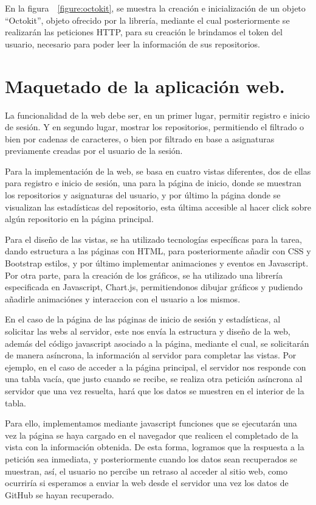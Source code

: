 En la figura~~\ref{figure:octokit}, se muestra la creación e inicialización de un objeto “Octokit”, objeto ofrecido por la librería, mediante el cual posteriormente se realizarán las peticiones HTTP, para su creación le brindamos el token del usuario, necesario para poder leer la información de sus repositorios. 



\section{Maquetado de la aplicación web.}

La funcionalidad de la web debe ser, en un primer lugar, permitir registro e inicio de sesión. Y en segundo lugar, mostrar los repositorios, permitiendo el filtrado o bien por cadenas de caracteres, o bien por filtrado en base a asignaturas previamente creadas por el usuario de la sesión.

Para la implementación de la web, se basa en cuatro vistas diferentes, dos de ellas para registro e inicio de sesión, una para la página de inicio, donde se muestran los repositorios y asignaturas del usuario, y por último la página donde se visualizan las estadísticas del repositorio, esta última accesible al hacer click sobre algún repositorio en la página principal.

Para el diseño de las vistas, se ha utilizado tecnologías específicas para la tarea, dando estructura a las páginas con HTML, para posteriormente añadir con CSS\cite{GradienteCSS} y Bootstrap\cite{Bootstrap} estilos, y por último implementar animaciones y eventos en Javascript. Por otra parte, para la creación de los gráficos, se ha utilizado una librería especificada en Javascript, Chart.js\cite{ChartJS,ChartJSIntro}, permitiendonos dibujar gráficos y pudiendo añadirle animaciónes y interaccion con el usuario a los mismos.

En el caso de la página de las páginas de inicio de sesión y estadísticas, al solicitar las webs al servidor, este nos envía la estructura y diseño de la web, además del código javascript asociado a la página,  mediante el cual, se solicitarán de manera asíncrona, la información al servidor para completar las vistas. Por ejemplo, en el caso de acceder a la página principal, el servidor nos responde con una tabla vacía, que justo cuando se recibe, se realiza otra petición asíncrona al servidor que una vez resuelta, hará que los datos se muestren en el interior de la tabla. 

Para ello, implementamos mediante javascript funciones que se ejecutarán una vez la página se haya cargado en el navegador que realicen el completado de la vista con la información obtenida. De esta forma, logramos que la respuesta a la petición sea inmediata, y posteriormente cuando los datos sean recuperados se muestran, así, el usuario no percibe un retraso al acceder al sitio web, como ocurriría si esperamos a enviar la web desde el servidor una vez los datos de GitHub se hayan recuperado.


